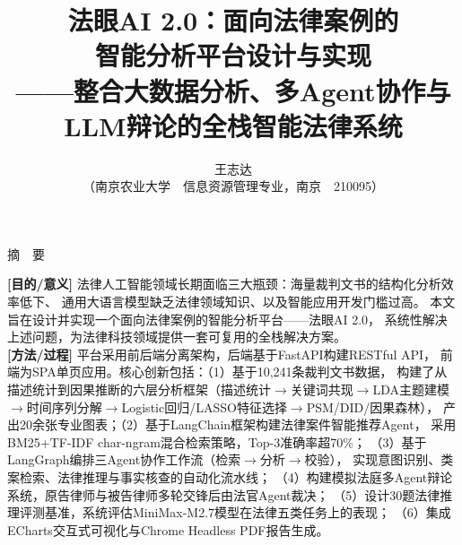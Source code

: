 \documentclass[12pt,a4paper,twoside]{ctexart}
\begin{document}
\title{
    \vspace{1.5cm}
    {\heiti\fontsize{18pt}{24pt}\selectfont 法眼AI 2.0：面向法律案例的\\[8pt]
     智能分析平台设计与实现}\\[16pt]
    {\kaishu\fontsize{14pt}{20pt}\selectfont ——整合大数据分析、多Agent协作与LLM辩论的全栈智能法律系统}
    \vspace{1cm}
}

\author{
    {\fontsize{12pt}{16pt}\selectfont 王志达}\\[6pt]
    {\fontsize{10pt}{14pt}\selectfont （南京农业大学\ \ 信息资源管理专业，南京\ \ 210095）}
}

\date{}
\maketitle
\thispagestyle{empty}

\begin{center}
{\heiti\fontsize{14pt}{18pt}\selectfont 摘\ \ 要}
\end{center}

\noindent
{\bfseries [目的/意义]} 法律人工智能领域长期面临三大瓶颈：海量裁判文书的结构化分析效率低下、
通用大语言模型缺乏法律领域知识、以及智能应用开发门槛过高。
本文旨在设计并实现一个面向法律案例的智能分析平台——法眼AI 2.0，
系统性解决上述问题，为法律科技领域提供一套可复用的全栈解决方案。\\[4pt]

\noindent
{\bfseries [方法/过程]} 平台采用前后端分离架构，后端基于FastAPI构建RESTful API，
前端为SPA单页应用。核心创新包括：（1）基于10,241条裁判文书数据，
构建了从描述统计到因果推断的六层分析框架（描述统计$\rightarrow$关键词共现$\rightarrow$LDA主题建模
$\rightarrow$时间序列分解$\rightarrow$Logistic回归/LASSO特征选择$\rightarrow$PSM/DID/因果森林），
产出20余张专业图表；（2）基于LangChain框架构建法律案件智能推荐Agent，
采用BM25+TF-IDF char-ngram混合检索策略，Top-3准确率超70\%；
（3）基于LangGraph编排三Agent协作工作流（检索$\rightarrow$分析$\rightarrow$校验），
实现意图识别、类案检索、法律推理与事实核查的自动化流水线；
（4）构建模拟法庭多Agent辩论系统，原告律师与被告律师多轮交锋后由法官Agent裁决；
（5）设计30题法律推理评测基准，系统评估MiniMax-M2.7模型在法律五类任务上的表现；
（6）集成ECharts交互式可视化与Chrome Headless PDF报告生成。\\[4pt]
\end{document}
